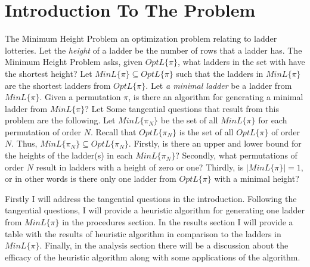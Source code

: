 \section{Introduction To The Problem}
The Minimum Height Problem an optimization problem relating to ladder lotteries.
Let the \emph{height} of a ladder be the number of rows that a ladder has. 
The Minimum Height Problem asks, given $OptL\{\pi\}$, what ladders in the set with have the shortest height? 
Let $MinL\{\pi\} \subseteq OptL\{\pi\}$ such that the ladders in $MinL\{\pi\}$ are the shortest ladders from 
$OptL\{\pi\}$. Let \emph{a minimal ladder} be a ladder from $MinL\{\pi\}$. Given a permutation $\pi$, is there an algorithm for generating a minimal ladder
from $MinL\{\pi\}$? Let  Some tangential questions that result from this problem are the following. Let $MinL\{\pi_{N}\}$ 
be the set of all $MinL\{\pi\}$ for each permutation of order $N$. Recall that $OptL\{\pi_{N}\}$ is the set of all 
$OptL\{\pi\}$ of order $N$. Thus, $MinL\{\pi_{N}\} \subseteq OptL\{\pi_{N}\}$.  Firstly, 
is there an upper and lower bound for the heights of the ladder(s) in each $MinL\{\pi_{N}\}$? 
Secondly, what permutations of order $N$ result in ladders with a height of zero or one? 
Thirdly, is $|MinL\{\pi\}|=1$, or in other words is there 
only one ladder from $OptL\{\pi\}$ with a minimal height?\par 
Firstly I will address the tangential questions in the introduction. Following the tangential questions, 
I will provide a heuristic algorithm for generating one ladder from $MinL\{\pi\}$ in the procedures section. 
In the results section I will provide a table with the results of heuristic algorithm in comparison to the ladders 
in $MinL\{\pi\}$. Finally, in the analysis section there will be a discussion 
about the efficacy of the heuristic algorithm along with some applications of the algorithm.\par 
